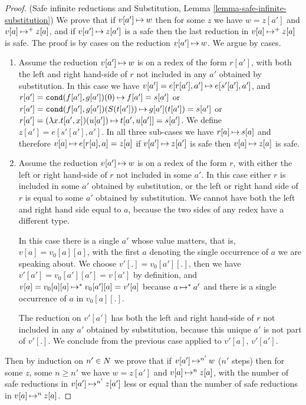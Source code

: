 \begin{proof}(Safe infinite reductions and Substitution, Lemma \ref{lemma-safe-infinite-substitution})
We prove that if $v[a'] \mathbin{\mapsto} w$ then for some $z$ we have $w=z[a']$ and $v[a] \mathbin{\mapsto}^+ z[a]$,
and if $v[a'] \mathbin{\mapsto} z[a']$ is a safe then the last reduction in $v[a] \mathbin{\mapsto}^+ z[a]$ is safe.
The proof is by cases on the reduction $v[a'] \mathbin{\mapsto} w$.  We argue by cases.

\begin{enumerate}

\item
Assume the reduction $v[a'] \mathbin{\mapsto} w$ is on a redex of the form $r[a']$, with both the left
and right hand-side of $r$ not included in any $a'$ obtained by substitution. 
In this case we have $v[a'] = e[r[a'],a'] \mathbin{\mapsto} e[s'[a'],a']$, and
$r[a'] = {\tt cond}(f[a'],g[a'])(0) \mathbin{\mapsto} f[a'] = s[a']$ or 
$r[a'] = {\tt cond}(f[a'],g[a'])(S(t[a'])) \mathbin{\mapsto} g[a'](t[a']) = s[a']$
or $r[a'] = (\lambda x.t[a',x])(u[a']) \mathbin{\mapsto} t[a',u[a']] = s[a']$. 
We define $z[a'] = e[s'[a'],a']$. 
In all three sub-cases we have $r[a] \mathbin{\mapsto} s[a]$ and therefore $v[a] \mathbin{\mapsto} e[r[a],a] = z[a]$
if $v[a'] \mathbin{\mapsto} z[a']$ is safe then $v[a] \mathbin{\mapsto} z[a]$ is safe.

\item
Assume the reduction $v[a'] \mathbin{\mapsto} w$ is on a redex of the form $r$, with either the left
or right hand-side of $r$ not included in some $a'$. In this case either $r$ is included in some $a'$ 
obtained by substitution, or the left or right hand side of $r$ is equal to some $a'$ obtained by substitution.
We cannot have both the left and right hand side equal to $a$, because the two sides of any redex 
have a different type.

In this case there is a single $a'$ whose value matters, that is, $v[a] = v_0[a][a]$, with the first $a$ denoting
the single occurrence of $a$ we are speaking about. We choose $v'[.] = v_0[a'][.]$, then we have
$v'[a']=v_0[a'][a']=v[a']$ by definition, and $v[a] = v_0[a][a] \mathbin{\mapsto}^{*} v_0[a'][a] = v'[a]$ 
because $a \mathbin{\mapsto}^{*} a'$ and there is a single occurrence of $a$ in $v_0[a][.]$. 

The reduction on $v'[a']$ has both the left
and right hand-side of $r$ not included in any $a'$ obtained by substitution, because this unique
$a'$ is not part of $v'[.]$. We conclude from the previous case applied to $v'[a]$, $v'[a']$.

\end{enumerate}
Then by induction on $n' \in {N}$ we prove that if $v[a'] \mathbin{\mapsto}^{n'} w$ ($n'$ steps) 
then for some $z$, some $n \ge n'$ we have $w=z[a']$ and $v[a] \mathbin{\mapsto}^{n} z[a]$,
with the number of safe reductions in  $v[a'] \mathbin{\mapsto}^{n'} z[a']$ less or equal than the number
of safe reductions in $v[a] \mathbin{\mapsto}^{n} z[a]$.

\end{proof}

